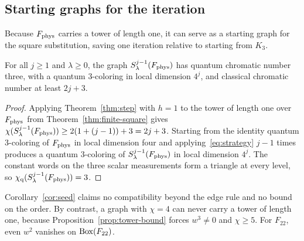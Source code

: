 \subsection{Starting graphs for the iteration}\label{sec:no-seed}

Because $F_{\rm phys}$ carries a tower of length one, it can serve as a starting graph for the square substitution, saving one iteration relative to starting from $K_3$.

\begin{corollary}\label{cor:seed}
For all $j\ge1$ and $\lambda\ge0$, the graph $S^{j-1}_\lambda(F_{\rm phys})$ has quantum chromatic number three, with a quantum $3$-coloring in local dimension $4^j$, and classical chromatic number at least $2j+3$.
\end{corollary}
\begin{proof}
Applying Theorem~\ref{thm:step} with $h=1$ to the tower of length one over $F_{\rm phys}$ from Theorem~\ref{thm:finite-square} gives $\chi(S^{j-1}_\lambda(F_{\rm phys}))\ge 2(1+(j-1))+3=2j+3$. Starting from the identity quantum $3$-coloring of $F_{\rm phys}$ in local dimension four and applying~\eqref{eq:strategy} $j-1$ times produces a quantum $3$-coloring of $S^{j-1}_\lambda(F_{\rm phys})$ in local dimension $4^j$. The constant words on the three scalar measurements form a triangle at every level, so $\chi_{\mathrm q}(S^{j-1}_\lambda(F_{\rm phys}))=3$.
\end{proof}

Corollary~\ref{cor:seed} claims no compatibility beyond the edge rule and no bound on the order. By contrast, a graph with $\chi=4$ can never carry a tower of length one, because Proposition~\ref{prop:tower-bound} forces $w^3\ne0$ and $\chi\ge5$. For $F_{22}$, even $w^2$ vanishes on $\operatorname{Box}(F_{22})$.

